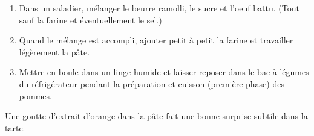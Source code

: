\altdish{}



\begin{ingredients}
\end{ingredients}


\begin{recipe}
  \begin{enumerate}

  \item Dans un saladier, m\'elanger le beurre ramolli, le sucre et l'oeuf
    battu.  (Tout sauf la farine et \'eventuellement le sel.)

  \item 
    Quand le m\'elange est accompli, ajouter petit \`a petit la farine et
    travailler l\'eg\`erement la p\^ate.

  \item Mettre en boule dans un linge humide et laisser reposer dans
    le bac \`a l\'egumes du r\'efrig\'erateur pendant la pr\'eparation
    et cuisson (premi\`ere phase) des pommes.

  \end{enumerate}

  Une goutte d'extrait d'orange dans la p\^ate fait une bonne surprise
  subtile dans la tarte.
\end{recipe}

\vfil\pagebreak    %
  

\begin{ingredients}
  \ingr{}{}{}
  \ingr{}{}{}
  \ingr{}{}{}
  \ingr{}{}{}
  \ingr{}{}{}
\end{ingredients}

